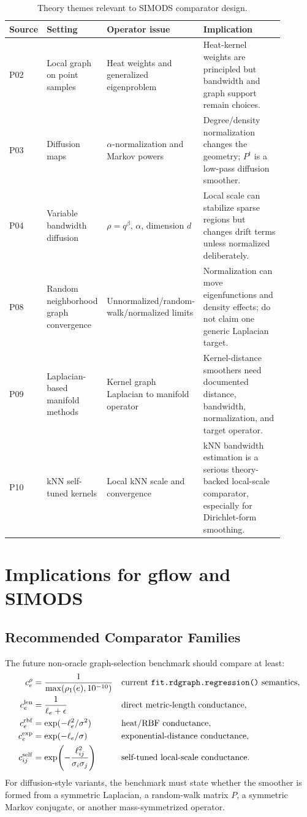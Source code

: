 \documentclass[11pt]{article}
\newcommand{\code}[1]{\texttt{#1}}
\begin{document}
\begin{longtable}{p{0.12\linewidth}p{0.22\linewidth}p{0.22\linewidth}p{0.33\linewidth}}
\caption{Theory themes relevant to SIMODS comparator design.}\\
\toprule
Source & Setting & Operator issue & Implication\\
\midrule
\endhead
P02 & Local graph on point samples & Heat weights and generalized eigenproblem & Heat-kernel weights are principled but bandwidth and graph support remain choices.\\
P03 & Diffusion maps & \(\alpha\)-normalization and Markov powers & Degree/density normalization changes the geometry; \(P^t\) is a low-pass diffusion smoother.\\
P04 & Variable bandwidth diffusion & \(\rho=q^\beta\), \(\alpha\), dimension \(d\) & Local scale can stabilize sparse regions but changes drift terms unless normalized deliberately.\\
P08 & Random neighborhood graph convergence & Unnormalized/random-walk/normalized limits & Normalization can move eigenfunctions and density effects; do not claim one generic Laplacian target.\\
P09 & Laplacian-based manifold methods & Kernel graph Laplacian to manifold operator & Kernel-distance smoothers need documented distance, bandwidth, normalization, and target operator.\\
P10 & kNN self-tuned kernels & Local kNN scale and convergence & kNN bandwidth estimation is a serious theory-backed local-scale comparator, especially for Dirichlet-form smoothing.\\
\bottomrule
\end{longtable}

\section{Implications for gflow and SIMODS}

\subsection{Recommended Comparator Families}

The future non-oracle graph-selection benchmark should compare at least:
\begin{align}
  c_e^\rho &= \frac{1}{\max(\rho_1(e),10^{-10})}
  &&\text{current \code{fit.rdgraph.regression()} semantics},\\
  c_e^{\mathrm{len}} &= \frac{1}{\ell_e+\epsilon}
  &&\text{direct metric-length conductance},\\
  c_e^{\mathrm{rbf}} &= \exp(-\ell_e^2/\sigma^2)
  &&\text{heat/RBF conductance},\\
  c_e^{\mathrm{exp}} &= \exp(-\ell_e/\sigma)
  &&\text{exponential-distance conductance},\\
  c_{ij}^{\mathrm{self}} &=
    \exp\!\left(-\frac{\ell_{ij}^2}{\sigma_i\sigma_j}\right)
  &&\text{self-tuned local-scale conductance}.
\end{align}
For diffusion-style variants, the benchmark must state whether the smoother is
formed from a symmetric Laplacian, a random-walk matrix \(P\), a symmetric
Markov conjugate, or another mass-symmetrized operator.
\end{document}
